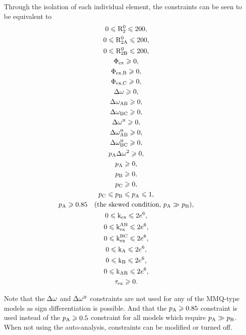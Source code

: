 \noindent  Through the isolation of each individual element, the constraints can be seen to be equivalent to
\begin{subequations}
\begin{gather} 
    0 \leqslant \mathrm{R}_2^0 \leqslant 200, \\
    0 \leqslant \mathrm{R}_\mathrm{2A}^0 \leqslant 200, \\
    0 \leqslant \mathrm{R}_\mathrm{2B}^0 \leqslant 200, \\
    \Phi_\textrm{ex} \geqslant 0, \\
    \Phi_\textrm{ex,B} \geqslant 0, \\
    \Phi_\textrm{ex,C} \geqslant 0, \\
    \Delta\omega \geqslant 0, \\
    \Delta\omega_\textrm{AB} \geqslant 0, \\
    \Delta\omega_\textrm{BC} \geqslant 0, \\
    \Delta\omega^{\scriptscriptstyle\mathrm{H}} \geqslant 0, \\
    \Delta\omega^{\scriptscriptstyle\mathrm{H}}_\textrm{AB} \geqslant 0, \\
    \Delta\omega^{\scriptscriptstyle\mathrm{H}}_\textrm{BC} \geqslant 0, \\
    p_\textrm{A}\Delta\omega^2 \geqslant 0, \\
    p_\textrm{A} \geqslant 0, \\
    p_\textrm{B} \geqslant 0, \\
    p_\textrm{C} \geqslant 0, \\
    p_\textrm{C} \leqslant p_\textrm{B} \leqslant p_\textrm{A} \leqslant 1, \\
    p_\textrm{A} \geqslant 0.85 \quad (\textrm{the skewed condition, } p_\textrm{A} \gg p_\textrm{B}), \\
    0 \leqslant \textrm{k}_\textrm{ex} \leqslant 2e^6, \\
    0 \leqslant \textrm{k}_\textrm{ex}^\textrm{AB} \leqslant 2e^6, \\
    0 \leqslant \textrm{k}_\textrm{ex}^\textrm{BC} \leqslant 2e^6, \\
    0 \leqslant \textrm{k}_\textrm{A} \leqslant 2e^6, \\
    0 \leqslant \textrm{k}_\textrm{B} \leqslant 2e^6, \\
    0 \leqslant \textrm{k}_\textrm{AB} \leqslant 2e^6, \\
    \tau_\textrm{ex} \geqslant 0.
\end{gather} 
\end{subequations}

Note that the $\Delta\omega$ and $\Delta\omega^{\scriptscriptstyle\mathrm{H}}$ constraints are not used for any of the MMQ-type models as sign differentiation is possible.
And that the $p_\textrm{A} \geqslant 0.85$ constraint is used instead of the $p_\textrm{A} \geqslant 0.5$ constraint for all models which require $p_\textrm{A} \gg p_\textrm{B}$.
When not using the auto-analysis, constraints can be modified or turned off.



